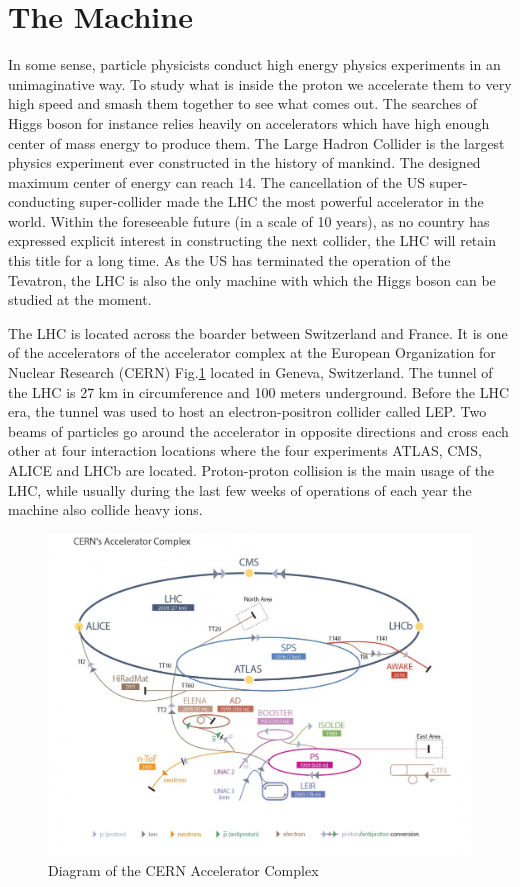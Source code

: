 \section{The Machine}

In some sense, particle physicists conduct high energy physics experiments in an unimaginative way. To study what is inside the proton we accelerate them to very high speed and smash them together to see what comes out. The searches of Higgs boson for instance relies heavily on accelerators which have high enough center of mass energy to produce them. The Large Hadron Collider is the largest physics experiment ever constructed in the history of mankind. The designed maximum center of energy can reach 14\tev. The cancellation of the US super-conducting super-collider made the LHC the most powerful accelerator in the world. Within the foreseeable future (in a scale of 10 years), as no country has expressed explicit interest in constructing the next collider, the LHC will retain this title for a long time. As the US has terminated the operation of the Tevatron, the LHC is also the only machine with which the Higgs boson can be studied at the moment.

The LHC is located across the boarder between Switzerland and France. It is one of the accelerators of the accelerator complex at the European Organization for Nuclear Research (CERN) Fig.\ref{fig:lhc-CERN} located in Geneva, Switzerland. The tunnel of the LHC is 27 km in circumference and 100 meters underground. Before the LHC era, the tunnel was used to host an electron-positron collider called LEP\cite{refneeded}. Two beams of particles go around the accelerator in opposite directions and cross each other at four interaction locations where the four experiments ATLAS, CMS, ALICE and LHCb are located. Proton-proton collision is the main usage of the LHC, while usually during the last few weeks of operations of each year the machine also collide heavy ions.

\begin{figure}[htpb!]
\begin{center}
  \includegraphics[width=0.7\linewidth]{figures/LHC/LHC_default}
\caption{Diagram of the CERN Accelerator Complex}
\label{fig:lhc-CERN}
\end{center}
\end{figure}


